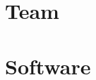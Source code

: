 \documentclass[8pt]{book}
\begin{document}
    \chapter{Team}
      
      
    \chapter{Software}
       
       
      
       
       
      
       
    
  
           


%         
        

%         
%         
    
%         


%         
    
%           
%         
%          
%           
%         
%         

    
%     
\end{document}
